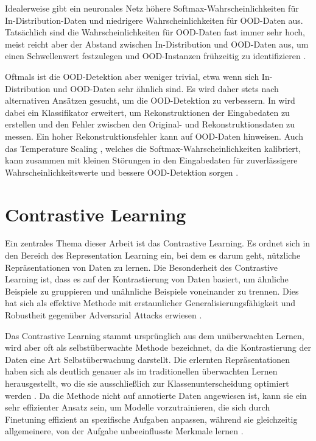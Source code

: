 Idealerweise gibt ein neuronales Netz höhere Softmax-Wahrscheinlichkeiten für In-Distribution-Daten und niedrigere Wahrscheinlichkeiten für OOD-Daten aus. Tatsächlich sind die Wahrscheinlichkeiten für OOD-Daten fast immer sehr hoch, meist reicht aber der Abstand zwischen In-Distribution und OOD-Daten aus, um einen Schwellenwert festzulegen und OOD-Instanzen frühzeitig zu identifizieren \parencite{Hendrycks2018baselineooddetection}.

Oftmals ist die OOD-Detektion aber weniger trivial, etwa wenn sich In-Distribution und OOD-Daten sehr ähnlich sind. Es wird daher stets nach alternativen Ansätzen gesucht, um die OOD-Detektion zu verbessern. In \parencite{Hendrycks2018baselineooddetection} wird dabei ein Klassifikator erweitert, um Rekonstruktionen der Eingabedaten zu erstellen und den Fehler zwischen den Original- und Rekonstruktionsdaten zu messen. Ein hoher Rekonstruktionsfehler kann auf OOD-Daten hinweisen. Auch das Temperature Scaling \parencite{Guo2017tempscaling}, welches die Softmax-Wahrscheinlichkeiten kalibriert, kann zusammen mit kleinen Störungen in den Eingabedaten für zuverlässigere Wahrscheinlichkeitswerte und bessere OOD-Detektion sorgen \parencite{Liang2020odin}.

\section{Contrastive Learning} \label{sec:contrastive-learning}

Ein zentrales Thema dieser Arbeit ist das Contrastive Learning. Es ordnet sich in den Bereich des Representation Learning ein, bei dem es darum geht, nützliche Repräsentationen von Daten zu lernen. Die Besonderheit des Contrastive Learning ist, dass es auf der Kontrastierung von Daten basiert, um ähnliche Beispiele zu gruppieren und unähnliche Beispiele voneinander zu trennen. Dies hat sich als effektive Methode mit erstaunlicher Generalisierungsfähigkeit und Robustheit gegenüber Adversarial Attacks erwiesen \parencite{Liu2021understandimprovecontrastivelearning}.

Das Contrastive Learning stammt ursprünglich aus dem unüberwachten Lernen, wird aber oft als selbstüberwachte Methode bezeichnet, da die Kontrastierung der Daten eine Art Selbstüberwachung darstellt. Die erlernten Repräsentationen haben sich als deutlich genauer als im traditionellen überwachten Lernen herausgestellt, wo die sie ausschließlich zur Klassenunterscheidung optimiert werden \parencite{Keshtmand2022contrastood}. Da die Methode nicht auf annotierte Daten angewiesen ist, kann sie ein sehr effizienter Ansatz sein, um Modelle vorzutrainieren, die sich durch Finetuning effizient an spezifische Aufgaben anpassen, während sie gleichzeitig allgemeinere, von der Aufgabe unbeeinflusste Merkmale lernen \parencite{Radford2021learningtransferablevisualmodels}.

